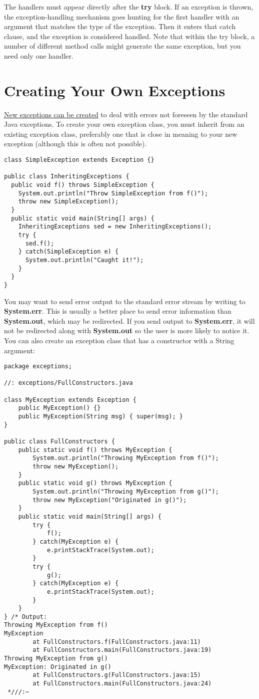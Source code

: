 \documentclass[10pt,letterpaper]{report}
\begin{document}
The handlers must appear directly after the \textbf{try} block. If an exception is thrown, the exception-handling mechanism goes hunting for the first handler with an argument that matches the type of the exception. Then it enters that catch clause, and the exception is considered handled. Note that within the try block, a number of different method calls might generate the same exception, but you need only one handler.

\section{Creating Your Own Exceptions}
\underline{New exceptions can be created} to deal with errors not foreseen by the standard Java exceptions.
To create your own exception class, you must inherit from an existing exception class, preferably one that is close in meaning to your new exception (although this is often not possible).

\begin{lstlisting}
class SimpleException extends Exception {}

public class InheritingExceptions {
  public void f() throws SimpleException {
    System.out.println("Throw SimpleException from f()");
    throw new SimpleException();
  }
  public static void main(String[] args) {
    InheritingExceptions sed = new InheritingExceptions();
    try {
      sed.f();
    } catch(SimpleException e) {
      System.out.println("Caught it!");
    }
  }
}
\end{lstlisting}

You may want to send error output to the standard error stream by writing to \textbf{System.err}. This is usually a better place to send error information than \textbf{System.out}, which may be redirected. If you send output to \textbf{System.err}, it will not be redirected along with \textbf{System.out} so the user is more likely to notice it. You can also create an exception class that has a constructor with a String argument:

\begin{lstlisting}
package exceptions;

//: exceptions/FullConstructors.java

class MyException extends Exception {
	public MyException() {}
	public MyException(String msg) { super(msg); }
}

public class FullConstructors {
	public static void f() throws MyException {
		System.out.println("Throwing MyException from f()");
		throw new MyException();
	}
	public static void g() throws MyException {
		System.out.println("Throwing MyException from g()");
		throw new MyException("Originated in g()");
	}
	public static void main(String[] args) {
		try {
			f();
		} catch(MyException e) {
			e.printStackTrace(System.out);
		}
		try {
			g();
		} catch(MyException e) {
			e.printStackTrace(System.out);
		}
	}
} /* Output:
Throwing MyException from f()
MyException
        at FullConstructors.f(FullConstructors.java:11)
        at FullConstructors.main(FullConstructors.java:19)
Throwing MyException from g()
MyException: Originated in g()
        at FullConstructors.g(FullConstructors.java:15)
        at FullConstructors.main(FullConstructors.java:24)
 *///:~
 \end{lstlisting}
\end{document}
